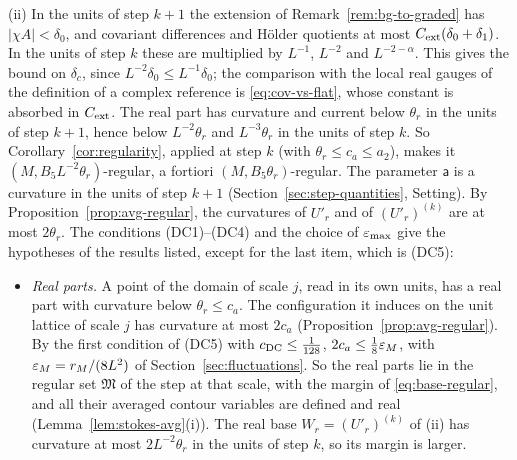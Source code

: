 \begin{remark}
(ii) In the units of step $k+1$ the extension of Remark~\ref{rem:bg-to-graded} has $|\chi A|<\delta_0$, and covariant differences and H\"older quotients at most $C_{\rm ext}(\delta_0+\delta_1)$. In the units of step $k$ these are multiplied by $L^{-1}$, $L^{-2}$ and $L^{-2-\alpha}$. This gives the bound on $\delta_c$, since $L^{-2}\delta_0\le L^{-1}\delta_0$; the comparison with the local real gauges of the definition of a complex reference is \eqref{eq:cov-vs-flat}, whose constant is absorbed in $C_{\rm ext}$. The real part has curvature and current below $\theta_r$ in the units of step $k+1$, hence below $L^{-2}\theta_r$ and $L^{-3}\theta_r$ in the units of step $k$. So Corollary~\ref{cor:regularity}, applied at step $k$ (with $\theta_r\le c_a\le a_2$), makes it $(M,B_5L^{-2}\theta_r)$-regular, a fortiori $(M,B_5\theta_r)$-regular. The parameter $\mathsf a$ is a curvature in the units of step $k+1$ (Section~\ref{sec:step-quantities}, Setting). By Proposition~\ref{prop:avg-regular}, the curvatures of $U'_r$ and of $(U'_r)^{(k)}$ are at most $2\theta_r$. The conditions (DC1)--(DC4) and the choice of $\varepsilon_{\max}$ give the hypotheses of the results listed, except for the last item, which is (DC5):
\begin{itemize}
\item \emph{Real parts.} A point of the domain of scale $j$, read in its own units, has a real part with curvature below $\theta_r\le c_a$. The configuration it induces on the unit lattice of scale $j$ has curvature at most $2c_a$ (Proposition~\ref{prop:avg-regular}). By the first condition of (DC5) with $c_{\rm DC}\le\frac1{128}$, $2c_a\le\frac18\varepsilon_M$, with $\varepsilon_M=r_M/(8L^2)$ of Section~\ref{sec:fluctuations}. So the real parts lie in the regular set $\mathfrak M$ of the step at that scale, with the margin of \eqref{eq:base-regular}, and all their averaged contour variables are defined and real (Lemma~\ref{lem:stokes-avg}(i)). The real base $W_r=(U'_r)^{(k)}$ of (ii) has curvature at most $2L^{-2}\theta_r$ in the units of step $k$, so its margin is larger.

\end{itemize}
\end{remark}
